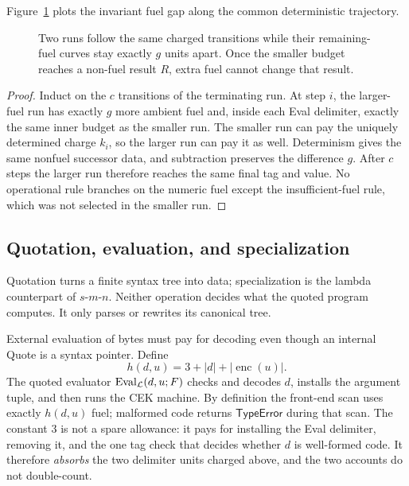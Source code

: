 Figure~\ref{fig:fuel-monotonicity} plots the invariant fuel gap along the
common deterministic trajectory.
\begin{figure}[t]
\centering

\caption{Two runs follow the same charged transitions while their remaining-fuel curves stay exactly \(g\) units apart.  Once the smaller budget reaches a non-fuel result \(R\), extra fuel cannot change that result.}
\label{fig:fuel-monotonicity}
\end{figure}

\begin{proof}
Induct on the \(c\) transitions of the terminating run.  At step \(i\), the
larger-fuel run has exactly \(g\) more ambient fuel and, inside each Eval
delimiter, exactly the same inner budget as the smaller run.  The smaller run
can pay the uniquely determined charge \(k_i\), so the larger run can pay it
as well.  Determinism gives the same nonfuel successor data, and subtraction
preserves the difference \(g\).  After \(c\) steps the larger run therefore
reaches the same final tag and value.  No operational rule branches on the
numeric fuel except the insufficient-fuel rule, which was not selected in the
smaller run.
\end{proof}

\subsection{Quotation, evaluation, and specialization}

\begin{reminder}
Quotation turns a finite syntax tree into data; specialization is the lambda
counterpart of \(s\)-\(m\)-\(n\).  Neither operation decides what the quoted
program computes.  It only parses or rewrites its canonical tree.
\end{reminder}

External evaluation of bytes must pay for decoding even though an internal
Quote is a syntax pointer.  Define
\[
 h(d,u)=3+|d|+|\operatorname{enc}(u)|.
\]
The quoted evaluator \(\operatorname{Eval}_{\mathcal L}(d,u;F)\) checks and decodes \(d\),
installs the argument tuple, and then runs the CEK machine.  By definition the
front-end scan uses exactly \(h(d,u)\) fuel; malformed code returns
\(\mathsf{TypeError}\) during that scan.  The constant \(3\) is not a spare
allowance: it pays for installing the Eval delimiter, removing it, and the one
tag check that decides whether \(d\) is well-formed code.  It therefore
\emph{absorbs} the two delimiter units charged above, and the two accounts do
not double-count.

